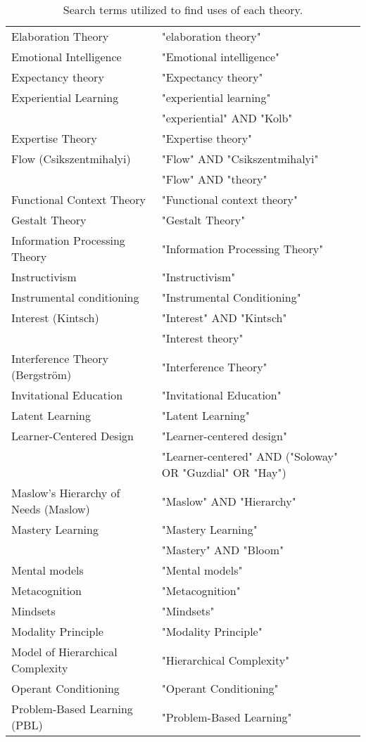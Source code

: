 \begin{table*}[t]
\begin{tabular}{ll}
Elaboration Theory & "elaboration theory"\\
Emotional Intelligence & "Emotional intelligence"\\
Expectancy theory & "Expectancy theory"\\
Experiential Learning & "experiential learning"\\
 & "experiential" AND "Kolb"\\
Expertise Theory & "Expertise theory"\\
Flow (Csikszentmihalyi) & "Flow" AND "Csikszentmihalyi"\\
 & "Flow" AND "theory"\\
Functional Context Theory & "Functional context theory"\\
Gestalt Theory & "Gestalt Theory"\\
Information Processing Theory & "Information Processing Theory"\\
Instructivism & "Instructivism"\\
Instrumental conditioning & "Instrumental Conditioning"\\
Interest (Kintsch) & "Interest" AND "Kintsch"\\
 & "Interest theory"\\
Interference Theory (Bergström) & "Interference Theory"\\
Invitational Education & "Invitational Education"\\
Latent Learning & "Latent Learning"\\
Learner-Centered Design & "Learner-centered design"\\
 & "Learner-centered" AND ("Soloway" OR "Guzdial" OR "Hay")\\
Maslow's Hierarchy of Needs (Maslow) & "Maslow" AND "Hierarchy"\\
Mastery Learning & "Mastery Learning"\\
 & "Mastery" AND "Bloom"\\
Mental models & "Mental models"\\
Metacognition & "Metacognition"\\
Mindsets & "Mindsets"\\
Modality Principle & "Modality Principle"\\
Model of Hierarchical Complexity & "Hierarchical Complexity"\\
Operant Conditioning & "Operant Conditioning"\\
Problem-Based Learning (PBL) & "Problem-Based Learning"
\end{tabular}
\caption{Search terms utilized to find uses of each theory.}
\end{table*}
